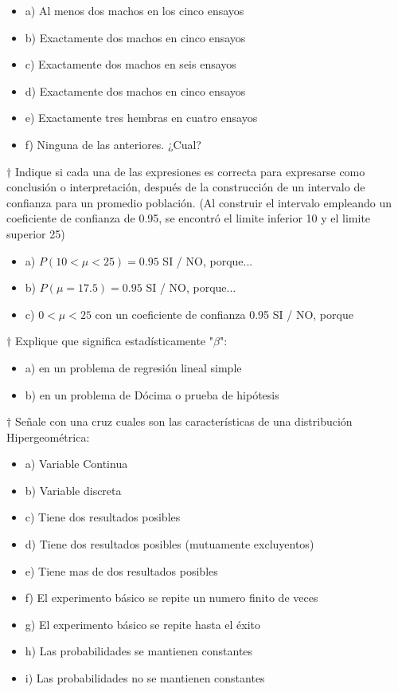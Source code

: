 \documentclass[10pt,a4paper]{article}
\begin{document}
\begin{itemize}
	\item a) Al menos dos machos en los cinco ensayos
	\item b) Exactamente dos machos en cinco ensayos
	\item c) Exactamente dos machos en seis ensayos
	\item d) Exactamente dos machos en cinco ensayos
	\item e) Exactamente tres hembras en cuatro ensayos
	\item f) Ninguna de las anteriores. ¿Cual?
\end{itemize}

$\dagger$ Indique si cada una de las expresiones es correcta para expresarse como conclusión o interpretación, después de la construcción de un intervalo de confianza para un promedio población. (Al construir el intervalo empleando un coeficiente de confianza de 0.95, se encontró el limite inferior 10 y el limite superior 25)

\begin{itemize}
	\item a) $P(10<\mu <25) = 0.95$ SI / NO, porque...
	\item b) $P(\mu=17.5)=0.95$ SI / NO, porque...
	\item c) $0<\mu< 25$ con un coeficiente de confianza 0.95 SI / NO, porque
\end{itemize}

$\dagger$ Explique que significa estadísticamente "$\beta$":
\begin{itemize}
	\item a) en un problema de regresión lineal simple
	\item b) en un problema de Dócima o prueba de hipótesis
\end{itemize}

$\dagger$ Señale con una cruz cuales son las características de una distribución Hipergeométrica:
\begin{itemize}
	\item a) Variable Continua
	\item b) Variable discreta
	\item c) Tiene dos resultados posibles
	\item d) Tiene dos resultados posibles (mutuamente excluyentos)
	\item e) Tiene mas de dos resultados posibles
	\item f) El experimento básico se repite un numero finito de veces
	\item g) El experimento básico se repite hasta el éxito
	\item h) Las probabilidades se mantienen constantes
	\item i) Las probabilidades no se mantienen constantes
\end{itemize}
\end{document}

